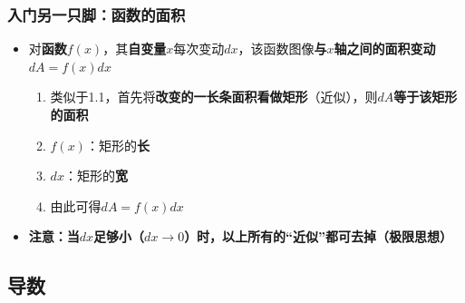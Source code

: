 \documentclass[UTF8]{ctexart}
\begin{document}
\subsubsection{入门另一只脚：函数的面积}
\begin{itemize}
	\item 对{\bfseries 函数}$f(x)$，其{\bfseries 自变量}$x$每次变动$dx$，该函数图像{\bfseries 与$x$轴之间的面积变动}$dA = f(x)dx$ \begin{enumerate}
		\item 类似于1.1，首先将{\bfseries 改变的一长条面积看做矩形}（近似），则$dA${\bfseries 等于该矩形的面积}
		\item $f(x)$：矩形的{\bfseries 长}
		\item $dx$：矩形的{\bfseries 宽}
		\item 由此可得$dA = f(x)dx$
	\end{enumerate}
	\item {\bfseries 注意：当$dx$足够小（$dx\to0$）时，以上所有的“近似”都可去掉（极限思想）}
\end{itemize}

\subsection{导数}
\end{document}

